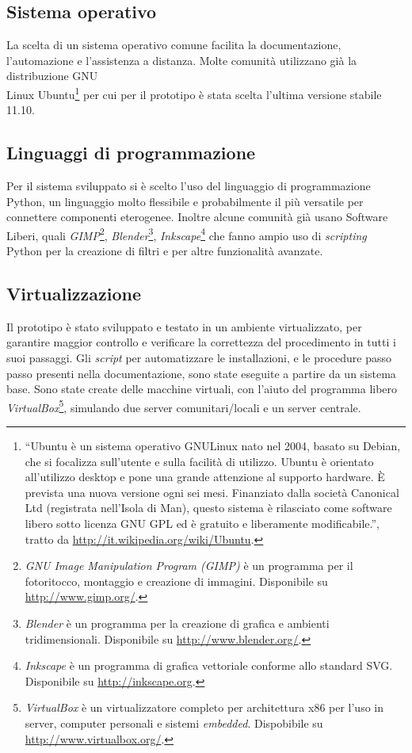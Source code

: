 \subsection{Sistema operativo}
La scelta di un sistema operativo comune facilita la documentazione,
l'automazione e l'assistenza a distanza. Molte comunità utilizzano già
la distribuzione GNU\\Linux Ubuntu\footnote{``Ubuntu è un sistema
  operativo GNU\/Linux nato nel 2004, basato su Debian, che si
  focalizza sull'utente e sulla facilità di utilizzo. Ubuntu è
  orientato all'utilizzo desktop e pone una grande attenzione al
  supporto hardware. È prevista una nuova versione ogni sei mesi.
  Finanziato dalla società Canonical Ltd (registrata nell'Isola di
  Man), questo sistema è rilasciato come software libero sotto licenza
  GNU GPL ed è gratuito e liberamente modificabile.'', tratto da
  \url{http://it.wikipedia.org/wiki/Ubuntu}.} per cui per il prototipo
è stata scelta l'ultima versione stabile 11.10.

\subsection{Linguaggi di programmazione}
Per il sistema sviluppato si è scelto l'uso del linguaggio di
programmazione Python, un linguaggio molto flessibile e probabilmente
il più versatile per connettere componenti eterogenee. Inoltre alcune
comunità già usano Software Liberi, quali
\emph{GIMP}\footnote{\emph{GNU Image Manipulation Program (GIMP)} è un
  programma per il fotoritocco, montaggio e creazione di
  immagini. Disponibile su \url{http://www.gimp.org/}.},
\emph{Blender}\footnote{\emph{Blender} è un programma per la creazione
  di grafica e ambienti tridimensionali. Disponibile su
  \url{http://www.blender.org/}.},
\emph{Inkscape}\footnote{\emph{Inkscape} è un programma di grafica
  vettoriale conforme allo standard SVG. Disponibile su
  \url{http://inkscape.org}.} che fanno ampio uso di \emph{scripting}
Python per la creazione di filtri e per altre funzionalità avanzate.

\subsection{Virtualizzazione}
Il prototipo è stato sviluppato e testato in un ambiente
virtualizzato, per garantire maggior controllo e verificare la
correttezza del procedimento in tutti i suoi passaggi. Gli
\emph{script} per automatizzare le installazioni, e le procedure passo
passo presenti nella documentazione, sono state eseguite a partire da
un sistema base. Sono state create delle macchine virtuali, con
l'aiuto del programma libero
\emph{VirtualBox}\footnote{\emph{VirtualBox} è un virtualizzatore
  completo per architettura x86 per l'uso in server, computer
  personali e sistemi \emph{embedded}. Dispobibile su
  \url{http://www.virtualbox.org/}.}, simulando due server
comunitari/locali e un server centrale.


